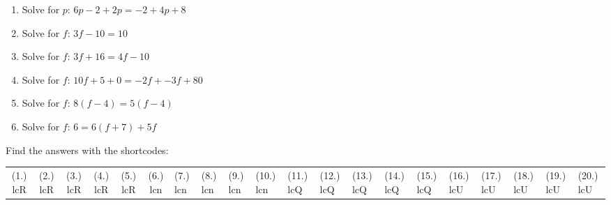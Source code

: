 \begin{enumerate}[noitemsep, label=\textbf{\arabic*}. ]
\label{m39241*uid25}\item Solve for $p$: $6p-2+2p=-2+4p+8$\hspace{1ex}        
\label{m39241*uid26}\item Solve for $f$: $3f-10=10$\hspace{1ex}        
\label{m39241*uid27}\item Solve for $f$: $3f+16=4f-10$\hspace{1ex}        
\label{m39241*uid28}\item Solve for $f$: $10f+5+0=-2f+-3f+80$\hspace{1ex}        
\label{m39241*uid29}\item Solve for $f$: $8\left(f-4\right)=5\left(f-4\right)$\hspace{1ex}        
\label{m39241*uid30}\item Solve for $f$: $6=6\left(f+7\right)+5f$\hspace{1ex}        
\end{enumerate}
\label{m39241**end}
\par {} Find the answers with the shortcodes:
 \par \begin{tabular}[h]{cccccc}
 (1.) lcR  &  (2.) lcR  &  (3.) lcR  &  (4.) lcR  &  (5.) lcR  &  (6.) lcn  &  (7.) lcn  &  (8.) lcn  &  (9.) lcn  &  (10.) lcn  &  (11.) lcQ  &  (12.) lcQ  &  (13.) lcQ  &  (14.) lcQ  &  (15.) lcQ  &  (16.) lcU  &  (17.) lcU  &  (18.) lcU  &  (19.) lcU  &  (20.) lcU  & \end{tabular}
